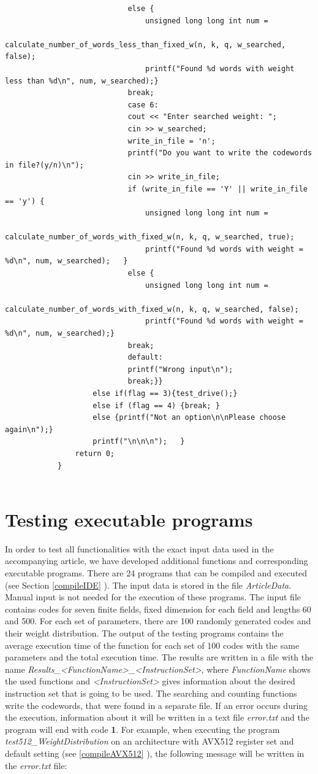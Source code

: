 \begin{small}
\begin{verbatim}
							else {
								unsigned long long int num = 
								calculate_number_of_words_less_than_fixed_w(n, k, q, w_searched, false);
								printf("Found %d words with weight less than %d\n", num, w_searched);}
							break;
							case 6:
							cout << "Enter searched weight: ";
							cin >> w_searched;
							write_in_file = 'n';
							printf("Do you want to write the codewords in file?(y/n)\n");
							cin >> write_in_file;
							if (write_in_file == 'Y' || write_in_file == 'y') {
								unsigned long long int num = 
								calculate_number_of_words_with_fixed_w(n, k, q, w_searched, true);
								printf("Found %d words with weight = %d\n", num, w_searched);	}
							else {
								unsigned long long int num = 
								calculate_number_of_words_with_fixed_w(n, k, q, w_searched, false);
								printf("Found %d words with weight = %d\n", num, w_searched);}
							break;
							default:
							printf("Wrong input\n");
							break;}}
					else if(flag == 3){test_drive();}
					else if (flag == 4) {break;	}
					else {printf("Not an option\n\nPlease choose again\n");}
					printf("\n\n\n");	}
				return 0;
			}
			
		\end{verbatim}
	\end{small}


	\section{Testing executable programs}
	In order to test all functionalities with the exact input data used in the accompanying article, we have developed additional functions and corresponding executable programs. There are 24 programs that can be compiled and executed (see Section \ref{compileIDE} ). The input data is stored in the file  \emph{ArticleData}. Manual input is not needed for the execution of these programs. The input file contains codes for seven finite fields, fixed dimension for each field and lengths 60 and 500. For each set of parameters, there are 100 randomly generated codes and their weight distribution. The output of the testing programs contains the average execution time of the function for each set of 100 codes with the same parameters and the total execution time. The results are written in a file with the name \emph{Results\_<FunctionName>\_<InstructionSet>}, where \emph{FunctionName} shows the used functions and \emph{<InstructionSet>} gives information about the desired instruction set that is going to be used. The searching and counting functions write the codewords, that were found in a separate file. If an error occurs during the execution, information about it will be written in a text file \emph{error.txt} and the program will end with code \textbf{1}. For example, when executing the program \emph{test512\_WeightDistribution} on an architecture with AVX512 register set and default setting (see \ref{compileAVX512} ), the following message will be written in the \emph{error.txt} file:
	
